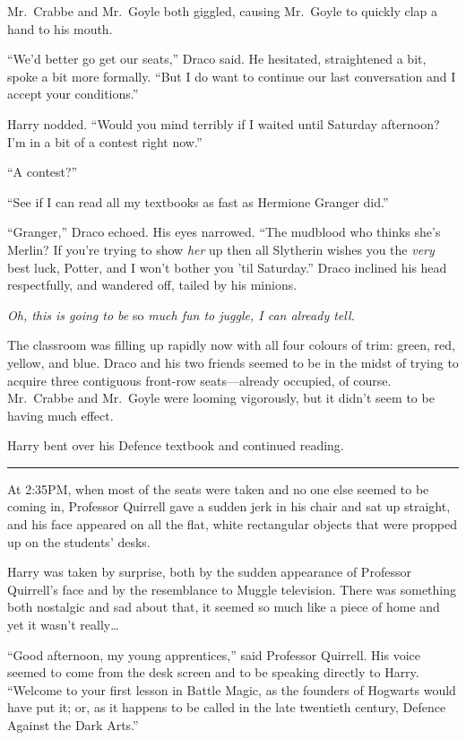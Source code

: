 Mr.~Crabbe and Mr.~Goyle both giggled, causing Mr.~Goyle to quickly clap
a hand to his mouth.

``We'd better go get our seats,'' Draco said. He hesitated, straightened
a bit, spoke a bit more formally. ``But I do want to continue our last
conversation and I accept your conditions.''

Harry nodded. ``Would you mind terribly if I waited until Saturday
afternoon? I'm in a bit of a contest right now.''

``A contest?''

``See if I can read all my textbooks as fast as Hermione Granger did.''

``Granger,'' Draco echoed. His eyes narrowed. ``The mudblood who thinks
she's Merlin? If you're trying to show \emph{her} up then all Slytherin
wishes you the \emph{very} best luck, Potter, and I won't bother you
'til Saturday.'' Draco inclined his head respectfully, and wandered off,
tailed by his minions.

\emph{Oh, this is going to be} so \emph{much fun to juggle, I can
already tell.}

The classroom was filling up rapidly now with all four colours of trim:
green, red, yellow, and blue. Draco and his two friends seemed to be in
the midst of trying to acquire three contiguous front-row
seats---already occupied, of course. Mr.~Crabbe and Mr.~Goyle were
looming vigorously, but it didn't seem to be having much effect.

Harry bent over his Defence textbook and continued reading.

\begin{center}\rule{3in}{0.4pt}\end{center}

At 2:35PM, when most of the seats were taken and no one else seemed to
be coming in, Professor Quirrell gave a sudden jerk in his chair and sat
up straight, and his face appeared on all the flat, white rectangular
objects that were propped up on the students' desks.

Harry was taken by surprise, both by the sudden appearance of Professor
Quirrell's face and by the resemblance to Muggle television. There was
something both nostalgic and sad about that, it seemed so much like a
piece of home and yet it wasn't really\ldots{}

``Good afternoon, my young apprentices,'' said Professor Quirrell. His
voice seemed to come from the desk screen and to be speaking directly to
Harry. ``Welcome to your first lesson in Battle Magic, as the founders
of Hogwarts would have put it; or, as it happens to be called in the
late twentieth century, Defence Against the Dark Arts.''

